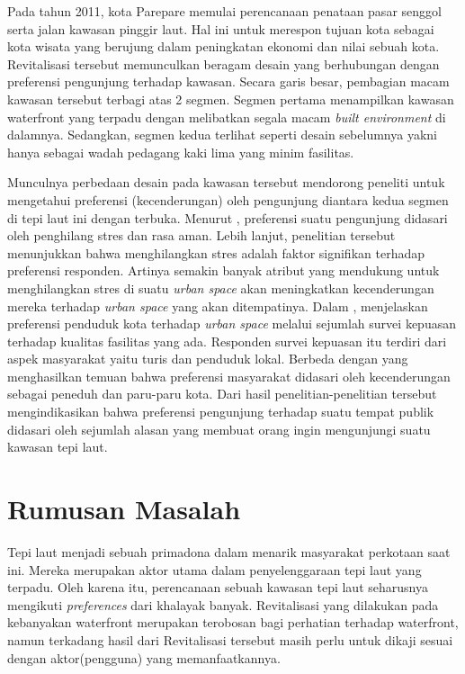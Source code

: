 \documentclass[../projects/thesis.tex]{subfiles}
\begin{document}
Pada tahun 2011, kota Parepare memulai perencanaan penataan pasar senggol serta jalan kawasan pinggir laut. Hal ini untuk merespon tujuan kota sebagai kota wisata yang berujung dalam peningkatan ekonomi dan nilai sebuah kota. Revitalisasi tersebut memunculkan beragam desain yang berhubungan dengan  preferensi pengunjung terhadap kawasan. Secara garis besar, pembagian macam kawasan tersebut terbagi atas 2 segmen. Segmen pertama menampilkan kawasan waterfront yang terpadu dengan melibatkan segala macam \textit{built environment} di dalamnya. Sedangkan, segmen kedua terlihat seperti desain sebelumnya yakni hanya sebagai wadah pedagang kaki lima yang minim fasilitas.

Munculnya perbedaan desain pada kawasan tersebut mendorong peneliti untuk mengetahui preferensi (kecenderungan) oleh pengunjung diantara kedua segmen di tepi laut ini dengan terbuka. Menurut \cite{thomas2020}, preferensi suatu pengunjung didasari oleh penghilang stres dan rasa aman. Lebih lanjut, penelitian tersebut menunjukkan bahwa menghilangkan stres adalah faktor signifikan terhadap preferensi responden. Artinya semakin banyak atribut yang mendukung untuk menghilangkan stres di suatu \textit{urban space} akan meningkatkan kecenderungan mereka terhadap \textit{urban space} yang akan ditempatinya.
Dalam \citep{wang2020}, menjelaskan preferensi penduduk kota terhadap \textit{urban space} melalui sejumlah survei kepuasan terhadap kualitas fasilitas yang ada. Responden survei kepuasan itu terdiri dari aspek masyarakat yaitu turis dan penduduk lokal.
Berbeda dengan \cite{imansari2015} yang menghasilkan temuan bahwa preferensi masyarakat didasari oleh kecenderungan sebagai peneduh dan paru-paru kota.
Dari hasil penelitian-penelitian tersebut mengindikasikan bahwa preferensi pengunjung terhadap suatu tempat publik didasari oleh sejumlah alasan yang membuat orang ingin mengunjungi suatu kawasan tepi laut.

\section{Rumusan Masalah}
Tepi laut menjadi sebuah primadona dalam menarik masyarakat perkotaan saat ini. Mereka merupakan aktor utama dalam penyelenggaraan tepi laut yang terpadu. Oleh karena itu, perencanaan sebuah kawasan tepi laut seharusnya mengikuti \textit{preferences} dari khalayak banyak. Revitalisasi yang dilakukan pada kebanyakan waterfront merupakan terobosan bagi perhatian terhadap waterfront, namun terkadang hasil dari Revitalisasi tersebut masih perlu untuk dikaji sesuai dengan aktor(pengguna) yang memanfaatkannya.
\end{document}
